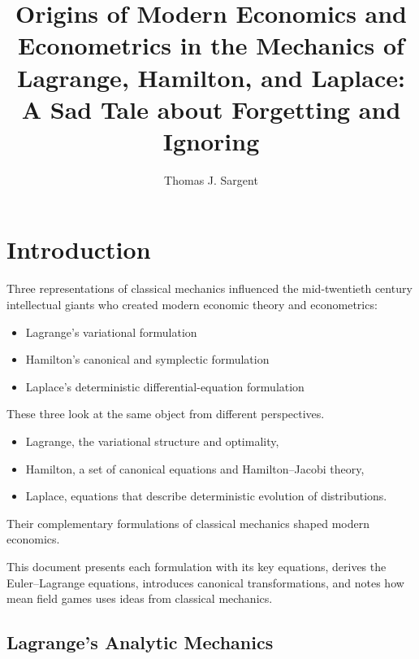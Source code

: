 \documentclass[12pt]{article}
\title{Origins of Modern Economics and Econometrics in  the Mechanics of Lagrange, Hamilton, and Laplace: A Sad Tale about Forgetting and Ignoring}
\author{Thomas J. Sargent}
\date{}
\begin{document}
\maketitle

\section{Introduction}

Three representations of classical mechanics  influenced the mid-twentieth century intellectual giants who created modern economic theory and econometrics: \begin{itemize}
\item Lagrange's variational formulation
\item Hamilton's canonical and symplectic formulation
\item Laplace's deterministic differential-equation formulation
\end{itemize}


\noindent These  three %
 look at the same object from  different perspectives.  
\begin{itemize}
\item  Lagrange, the variational structure and optimality,
\item  Hamilton, a set of  canonical equations and Hamilton--Jacobi theory,
\item  Laplace, equations that describe deterministic evolution of distributions.
\end{itemize}
Their %
 complementary formulations of classical mechanics   shaped modern economics.


This document presents each formulation with its key equations, derives the Euler--Lagrange equations, introduces canonical transformations, 
 and notes how mean field games uses ideas from classical mechanics.



\subsection*{Lagrange's Analytic Mechanics}
\end{document}
